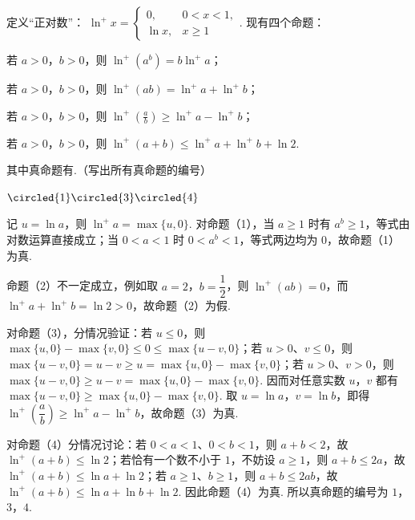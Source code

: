 \begin{problem}
定义“正对数”： \( \ln^{+} x=\begin{cases}
0,&0<x<1,\\
\ln x,&x\geqslant1
\end{cases} \).
现有四个命题：
\begin{circlelist}
\item 若 \(a > 0\)，\(b > 0\)，则 \( \ln^{+}(a^{b}) = b\ln^{+} a \)；
\item 若 \(a > 0\)，\(b > 0\)，则 \( \ln^{+}(ab) = \ln^{+}a + \ln^{+}b \)；
\item 若 \(a > 0\)，\(b > 0\)，则 \( \ln^{+}\left(\frac{a}{b}\right) \geqslant \ln^{+} a - \ln^{+} b \)；
\item 若 \(a > 0\)，\(b > 0\)，则 \( \ln^{+}(a + b) \leqslant \ln^{+} a + \ln^{+} b + \ln 2 \).
\end{circlelist}

其中真命题有\fillinblank{}.（写出所有真命题的编号）
\end{problem}

\begin{answer}
\(\circled{1}\circled{3}\circled{4}\)
\end{answer}

\begin{solution}
记 \(u=\ln a\)，则 \(\ln^{+}a=\max\{u,0\}\). 对命题（1），当 \(a\geqslant1\) 时有 \(a^b\geqslant1\)，等式由对数运算直接成立；当 \(0<a<1\) 时 \(0<a^b<1\)，等式两边均为 \(0\)，故命题（1）为真.

命题（2）不一定成立，例如取 \(a=2\)，\(b=\dfrac12\)，则 \(\ln^{+}(ab)=0\)，而 \(\ln^{+}a+\ln^{+}b=\ln2>0\)，故命题（2）为假.

对命题（3），分情况验证：若 \(u\leqslant0\)，则 \(\max\{u,0\}-\max\{v,0\}\leqslant0\leqslant\max\{u-v,0\}\)；若 \(u>0\)、\(v\leqslant0\)，则 \(\max\{u-v,0\}=u-v\geqslant u=\max\{u,0\}-\max\{v,0\}\)；若 \(u>0\)、\(v>0\)，则 \(\max\{u-v,0\}\geqslant u-v=\max\{u,0\}-\max\{v,0\}\). 因而对任意实数 \(u\)，\(v\) 都有 \(\max\{u-v,0\}\geqslant\max\{u,0\}-\max\{v,0\}\). 取 \(u=\ln a\)，\(v=\ln b\)，即得 \(\ln^{+}\left(\dfrac{a}{b}\right)\geqslant\ln^{+}a-\ln^{+}b\)，故命题（3）为真.

对命题（4）分情况讨论：若 \(0<a<1\)、\(0<b<1\)，则 \(a+b<2\)，故 \(\ln^{+}(a+b)\leqslant\ln2\)；若恰有一个数不小于 \(1\)，不妨设 \(a\geqslant1\)，则 \(a+b\leqslant2a\)，故 \(\ln^{+}(a+b)\leqslant\ln a+\ln2\)；若 \(a\geqslant1\)、\(b\geqslant1\)，则 \(a+b\leqslant2ab\)，故 \(\ln^{+}(a+b)\leqslant\ln a+\ln b+\ln2\). 因此命题（4）为真. 所以真命题的编号为 \(1\)，\(3\)，\(4\).
\end{solution}

